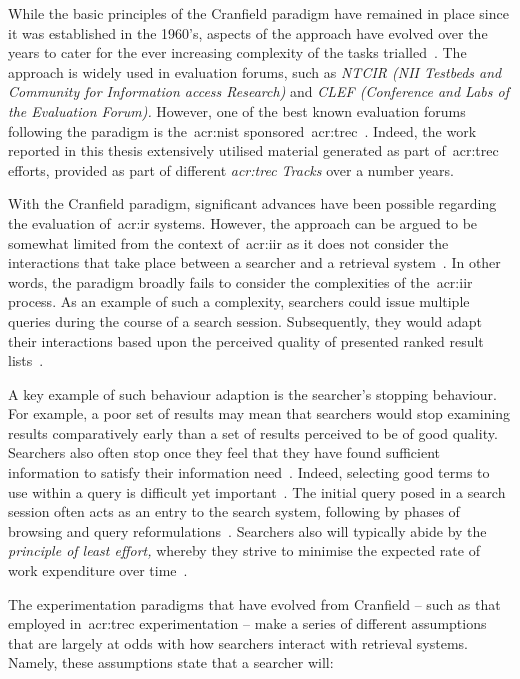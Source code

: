 While the basic principles of the Cranfield paradigm have remained in place since it was established in the 1960's, aspects of the approach have evolved over the years to cater for the ever increasing complexity of the tasks trialled~\citep{harman2010cranfield}. The approach is widely used in evaluation forums, such as \emph{NTCIR (NII Testbeds and Community for Information access Research)} and \emph{CLEF (Conference and Labs of the Evaluation Forum).} However, one of the best known evaluation forums following the paradigm is the~\gls{acr:nist} sponsored~\gls{acr:trec}~\citep{harman1993trec1}. Indeed, the work reported in this thesis extensively utilised material generated as part of~\gls{acr:trec} efforts, provided as part of different \emph{\gls{acr:trec} Tracks} over a number years.

With the Cranfield paradigm, significant advances have been possible regarding the evaluation of~\gls{acr:ir} systems. However, the approach can be argued to be somewhat limited from the context of~\gls{acr:iir} as it does not consider the interactions that take place between a searcher and a retrieval system~\citep{borlund2000evaluation_iir, ingwersen2005theturn}. In other words, the paradigm broadly fails to consider the complexities of the~\gls{acr:iir} process. As an example of such a complexity, searchers could issue multiple queries during the course of a search session. Subsequently, they would adapt their interactions based upon the perceived quality of presented ranked result lists~\citep{moffat2013users_versus_models}.

A key example of such behaviour adaption is the searcher's stopping behaviour. For example, a poor set of results may mean that searchers would stop examining results comparatively early than a set of results perceived to be of good quality. Searchers also often stop once they feel that they have found sufficient information to satisfy their information need~\citep{zach2005enough_is_enough}. Indeed, selecting good terms to use within a query is difficult yet important~\citep{efthimiadis2000query_expansion}. The initial query posed in a search session often acts as an entry to the search system, following by phases of browsing and query reformulations~\citep{marchionini1993information_seeking}. Searchers also will typically abide by the \emph{principle of least effort,} whereby they strive to minimise the expected rate of work expenditure over time~\citep{zipf1949behaviour}.

The experimentation paradigms that have evolved from Cranfield -- such as that employed in~\gls{acr:trec} experimentation -- make a series of different assumptions that are largely at odds with how searchers interact with retrieval systems. Namely, these assumptions state that a searcher will:

